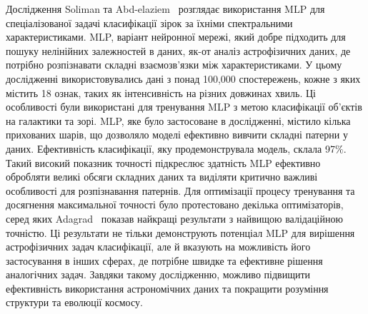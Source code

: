 Дослідження Soliman та Abd-elaziem~\cite{ct14} розглядає використання MLP для спеціалізованої задачі класифікації зірок за їхніми спектральними характеристиками. MLP, варіант нейронної мережі, який добре підходить для пошуку нелінійних залежностей в даних, як-от аналіз астрофізичних даних, де потрібно розпізнавати складні взаємозв'язки між характеристиками. У цьому дослідженні використовувались дані з понад 100,000 спостережень, кожне з яких містить 18 ознак, таких як інтенсивність на різних довжинах хвиль. Ці особливості були використані для тренування MLP з метою класифікації об'єктів на галактики та зорі. MLP, яке було застосоване в дослідженні, містило кілька прихованих шарів, що дозволяло моделі ефективно вивчити складні патерни у даних. Ефективність класифікації, яку продемонструвала модель, склала 97$\%$. Такий високий показник точності підкреслює здатність MLP ефективно обробляти великі обсяги складних даних та виділяти критично важливі особливості для розпізнавання патернів. Для оптимізації процесу тренування та досягнення максимальної точності було протестовано декілька оптимізаторів, серед яких Adagrad~\cite{ct29} показав найкращі результати з найвищою валідаційною точністю. Ці результати не тільки демонструють потенціал MLP для вирішення астрофізичних задач класифікації, але й вказують на можливість його застосування в інших сферах, де потрібне швидке та ефективне рішення аналогічних задач. Завдяки такому дослідженню, можливо підвищити ефективність використання астрономічних даних та покращити розуміння структури та еволюції космосу.


